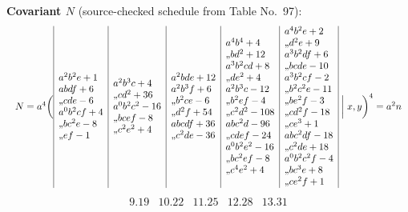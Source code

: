 \documentclass[11pt]{article}
\providecommand{\ditto}{\mathord{\hbox{,,}}}
\begin{document}
\noindent\textbf{Covariant $N$} (source-checked schedule from Table No.~97):
\[
\resizebox{\textwidth}{!}{$
N=a^{4}\biggl(
\begin{array}{|l|l|l|l|l|}
\begin{array}{@{}l@{}}
a^{2}b^{2}e+1\\
abdf+6\\
\ditto cde-6\\
a^{0}b^{2}cf+4\\
\ditto bc^{2}e-8\\
\ditto ef-1
\end{array}
&
\begin{array}{@{}l@{}}
a^{2}b^{3}c+4\\
\ditto cd^{2}+36\\
a^{0}b^{2}c^{2}-16\\
\ditto bcef-8\\
\ditto c^{2}e^{2}+4
\end{array}
&
\begin{array}{@{}l@{}}
a^{2}bde+12\\
a^{2}b^{3}f+6\\
\ditto b^{2}ce-6\\
\ditto d^{2}f+54\\
abcdf+36\\
\ditto c^{2}de-36
\end{array}
&
\begin{array}{@{}l@{}}
a^{4}b^{4}+4\\
\ditto bd^{2}+12\\
a^{3}b^{2}cd+8\\
\ditto de^{2}+4\\
a^{2}b^{3}c-12\\
\ditto b^{2}ef-4\\
\ditto c^{2}d^{2}-108\\
abc^{2}d-96\\
\ditto cdef-24\\
a^{0}b^{2}e^{2}-16\\
\ditto bc^{2}ef-8\\
\ditto c^{4}e^{2}+4
\end{array}
&
\begin{array}{@{}l@{}}
a^{4}b^{2}e+2\\
\ditto d^{2}e+9\\
a^{3}b^{2}df+6\\
\ditto bcde-10\\
a^{3}b^{2}cf-2\\
\ditto b^{2}c^{2}e-11\\
\ditto be^{2}f-3\\
\ditto cd^{2}f-18\\
\ditto ce^{3}+1\\
abc^{2}df-18\\
\ditto c^{2}de+18\\
a^{0}b^{2}c^{2}f-4\\
\ditto bc^{3}e+8\\
\ditto ce^{2}f+1
\end{array}
\end{array}
\biggm|x,y\biggr)^{4}=a^{2}n
$}
\]
\[
\begin{array}{ccccc}
9.19 & 10.22 & 11.25 & 12.28 & 13.31
\end{array}
\]
\end{document}
